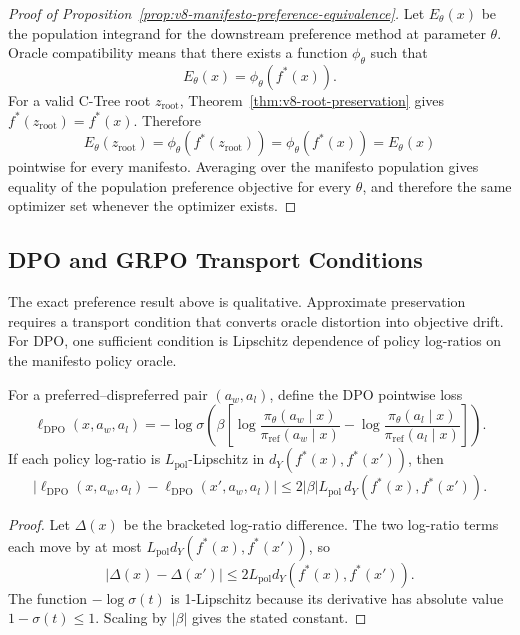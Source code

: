 \begin{proof}[Proof of Proposition~\ref{prop:v8-manifesto-preference-equivalence}]
Let \(E_\theta(x)\) be the population integrand for the downstream preference
method at parameter \(\theta\). Oracle compatibility means that there exists a
function \(\phi_\theta\) such that
\[
  E_\theta(x)=\phi_\theta(f^\ast(x)).
\]
For a valid C-Tree root \(z_{\mathrm{root}}\), Theorem~\ref{thm:v8-root-preservation}
gives \(f^\ast(z_{\mathrm{root}})=f^\ast(x)\). Therefore
\[
  E_\theta(z_{\mathrm{root}})
  =
  \phi_\theta(f^\ast(z_{\mathrm{root}}))
  =
  \phi_\theta(f^\ast(x))
  =
  E_\theta(x)
\]
pointwise for every manifesto. Averaging over the manifesto population gives
equality of the population preference objective for every \(\theta\), and
therefore the same optimizer set whenever the optimizer exists.
\end{proof}

\subsection{DPO and GRPO Transport Conditions}

The exact preference result above is qualitative. Approximate preservation
requires a transport condition that converts oracle distortion into objective
drift. For DPO, one sufficient condition is Lipschitz dependence of policy
log-ratios on the manifesto policy oracle.

\begin{lemma}
\label{lem:v8-dpo-transport}
For a preferred--dispreferred pair \((a_w,a_l)\), define the DPO pointwise
loss
\[
\ell_{\mathrm{DPO}}(x,a_w,a_l)
=
-\log\sigma\!\left(
\beta\left[
\log\frac{\pi_\theta(a_w\mid x)}{\pi_{\mathrm{ref}}(a_w\mid x)}
-
\log\frac{\pi_\theta(a_l\mid x)}{\pi_{\mathrm{ref}}(a_l\mid x)}
\right]\right).
\]
If each policy log-ratio is \(L_{\mathrm{pol}}\)-Lipschitz in
\(d_Y(f^\ast(x),f^\ast(x'))\), then
\[
|\ell_{\mathrm{DPO}}(x,a_w,a_l)-\ell_{\mathrm{DPO}}(x',a_w,a_l)|
\le
2|\beta|L_{\mathrm{pol}}\,
d_Y(f^\ast(x),f^\ast(x')) .
\]
\end{lemma}

\begin{proof}
Let \(\Delta(x)\) be the bracketed log-ratio difference. The two log-ratio
terms each move by at most
\(L_{\mathrm{pol}}d_Y(f^\ast(x),f^\ast(x'))\), so
\[
  |\Delta(x)-\Delta(x')|
  \le
  2L_{\mathrm{pol}}d_Y(f^\ast(x),f^\ast(x')) .
\]
The function \(-\log\sigma(t)\) is 1-Lipschitz because its derivative has
absolute value \(1-\sigma(t)\le 1\). Scaling by \(|\beta|\) gives the stated
constant.
\end{proof}

